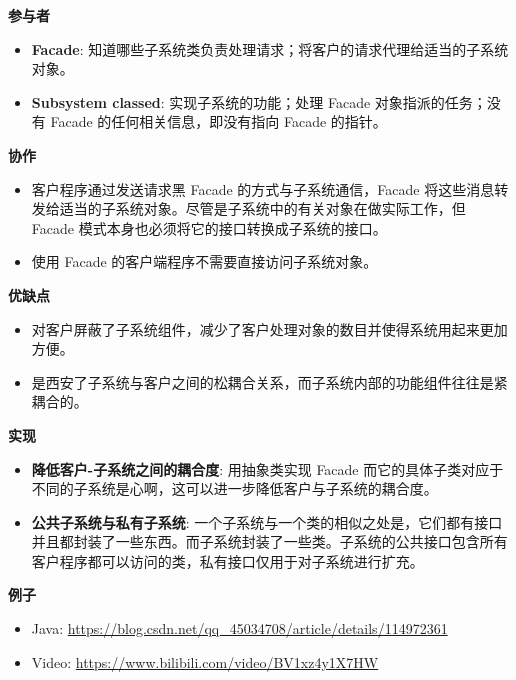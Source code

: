 \noindent\textbf{参与者}

\begin{itemize}
    \item \textbf{Facade}: 知道哪些子系统类负责处理请求；将客户的请求代理给适当的子系统对象。
    \item \textbf{Subsystem classed}: 实现子系统的功能；处理 Facade 对象指派的任务；没有 Facade 的任何相关信息，即没有指向 Facade 的指针。
\end{itemize}

\noindent\textbf{协作}

\begin{itemize}
    \item 客户程序通过发送请求黑 Facade 的方式与子系统通信，Facade 将这些消息转发给适当的子系统对象。尽管是子系统中的有关对象在做实际工作，但 Facade 模式本身也必须将它的接口转换成子系统的接口。
    \item 使用 Facade 的客户端程序不需要直接访问子系统对象。
\end{itemize}

\noindent\textbf{优缺点}

\begin{itemize}
    \item 对客户屏蔽了子系统组件，减少了客户处理对象的数目并使得系统用起来更加方便。
    \item 是西安了子系统与客户之间的松耦合关系，而子系统内部的功能组件往往是紧耦合的。
\end{itemize}

\noindent\textbf{实现}

\begin{itemize}
    \item \textbf{降低客户-子系统之间的耦合度}: 用抽象类实现 Facade 而它的具体子类对应于不同的子系统是心啊，这可以进一步降低客户与子系统的耦合度。
    \item \textbf{公共子系统与私有子系统}: 一个子系统与一个类的相似之处是，它们都有接口并且都封装了一些东西。而子系统封装了一些类。子系统的公共接口包含所有客户程序都可以访问的类，私有接口仅用于对子系统进行扩充。
\end{itemize}

\noindent\textbf{例子}

\begin{itemize}
    \item Java: \url{https://blog.csdn.net/qq_45034708/article/details/114972361}
    \item Video: \url{https://www.bilibili.com/video/BV1xz4y1X7HW}
\end{itemize}



\newpage
